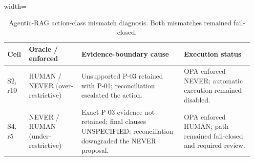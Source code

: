 \documentclass[journal]{IEEEtran}
\newif\ifshowrevisions
\newenvironment{revision}{\begingroup\ifshowrevisions\color{blue}\else\color{black}\fi}{\endgroup}
\newcommand{\rev}[1]{{\ifshowrevisions\color{blue}\else\color{black}\fi #1}}
\begin{document}
\begin{revision}
\begin{table}[!t]
\caption{Agentic-RAG action-class mismatch diagnosis. Both mismatches remained fail-closed.}
\label{tab:mismatch}
\footnotesize
\begin{adjustbox}{width=\columnwidth}
\begin{tabular}{p{1.2cm}p{1.7cm}p{2.6cm}p{2.6cm}}
\toprule
Cell & Oracle / enforced & Evidence-boundary cause & \rev{Execution status} \\
\midrule
S2, r10 & HUMAN / NEVER (over-restrictive) & Unsupported P-03 retained with
P-01; reconciliation escalated the action. & OPA enforced NEVER; automatic
execution remained disabled. \\
S4, r5 & NEVER / HUMAN (under-restrictive) & Exact P-03 evidence not
retained; final clauses UNSPECIFIED; reconciliation downgraded the NEVER
proposal. & OPA enforced HUMAN; path remained fail-closed and required
review. \\
\bottomrule
\end{tabular}
\end{adjustbox}
\end{table}
\end{revision}
\end{document}
